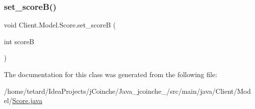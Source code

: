 \subsubsection{\texorpdfstring{set\+\_\+score\+B()}{set\_scoreB()}}
{\footnotesize\ttfamily void Client.\+Model.\+Score.\+set\+\_\+scoreB (\begin{DoxyParamCaption}\item[{int}]{scoreB }\end{DoxyParamCaption})\hspace{0.3cm}{\ttfamily [inline]}}



The documentation for this class was generated from the following file\+:\begin{DoxyCompactItemize}
\item 
/home/tetard/\+Idea\+Projects/j\+Coinche/\+Java\+\_\+jcoinche\+\_/src/main/java/\+Client/\+Model/\mbox{\hyperlink{Score_8java}{Score.\+java}}\end{DoxyCompactItemize}

